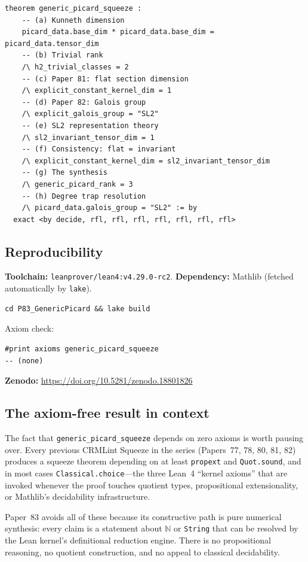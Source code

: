 \documentclass[11pt]{article}
\theoremstyle{plain}
\theoremstyle{definition}
\theoremstyle{remark}
\newcommand{\leanRepo}{\url{https://doi.org/10.5281/zenodo.18801826}}
\newcommand{\N}{\mathbb{N}}
\begin{document}
\begin{lstlisting}[caption={The Generic Picard Squeeze (Paper83\_GenericPicard.lean)}]
theorem generic_picard_squeeze :
    -- (a) Kunneth dimension
    picard_data.base_dim * picard_data.base_dim = picard_data.tensor_dim
    -- (b) Trivial rank
    /\ h2_trivial_classes = 2
    -- (c) Paper 81: flat section dimension
    /\ explicit_constant_kernel_dim = 1
    -- (d) Paper 82: Galois group
    /\ explicit_galois_group = "SL2"
    -- (e) SL2 representation theory
    /\ sl2_invariant_tensor_dim = 1
    -- (f) Consistency: flat = invariant
    /\ explicit_constant_kernel_dim = sl2_invariant_tensor_dim
    -- (g) The synthesis
    /\ generic_picard_rank = 3
    -- (h) Degree trap resolution
    /\ picard_data.galois_group = "SL2" := by
  exact <by decide, rfl, rfl, rfl, rfl, rfl, rfl, rfl>
\end{lstlisting}

\subsection{Reproducibility}

\textbf{Toolchain:} \texttt{leanprover/lean4:v4.29.0-rc2}.
\textbf{Dependency:} Mathlib (fetched automatically by \texttt{lake}).

\begin{verbatim}
cd P83_GenericPicard && lake build
\end{verbatim}

\noindent
Axiom check:
\begin{verbatim}
#print axioms generic_picard_squeeze
-- (none)
\end{verbatim}

\noindent
\textbf{Zenodo:} \leanRepo

\subsection{The axiom-free result in context}

The fact that \texttt{generic\_picard\_squeeze} depends on zero axioms is worth pausing over.
Every previous CRMLint Squeeze in the series (Papers~77, 78, 80, 81, 82) produces a squeeze theorem depending on at least \texttt{propext} and \texttt{Quot.sound}, and in most cases \texttt{Classical.choice}---the three Lean~4 ``kernel axioms'' that are invoked whenever the proof touches quotient types, propositional extensionality, or Mathlib's decidability infrastructure.

Paper~83 avoids all of these because its constructive path is pure numerical synthesis: every claim is a statement about $\N$ or \texttt{String} that can be resolved by the Lean kernel's definitional reduction engine.
There is no propositional reasoning, no quotient construction, and no appeal to classical decidability.
\end{document}

